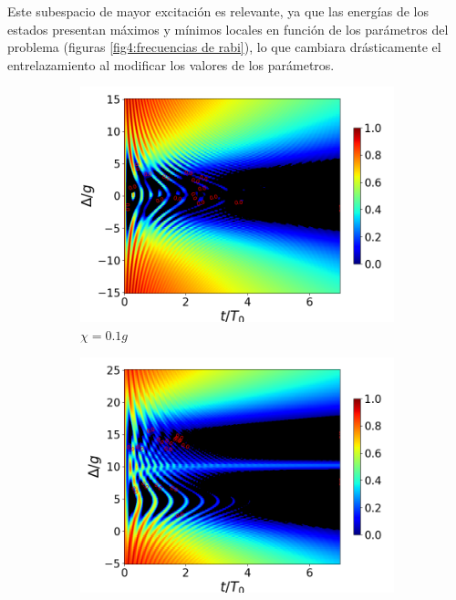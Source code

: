 Este subespacio de mayor excitación es relevante, ya que las energías de los estados presentan máximos y mínimos locales en función de los parámetros del problema (figuras \ref{fig4:frecuencias de rabi}), lo que cambiara drásticamente el entrelazamiento al modificar los valores de los parámetros.
\begin{figure}[h]
    \centering
    \begin{subfigure}{0.49\textwidth}
        \includegraphics[width=\textwidth]{figuras/ch4/concu/delta/eg1+ge1 k=0.0g x=0.1g J=0.0g gamma=0.25g concu delta dis.png}
        \caption{$\chi=0.1g$}
        \label{fig4:concu detunning 1 x1}
    \end{subfigure}
    \hfill
    \begin{subfigure}{0.49\textwidth}
        \includegraphics[width=\textwidth]{figuras/ch4/concu/delta/eg1+ge1 k=0.0g x=5.0g J=0.0g gamma=0.25g concu delta dis.png}

\end{subfigure}
\end{figure}

